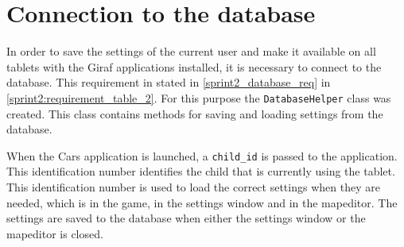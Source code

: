 \section{Connection to the database}
In order to save the settings of the current user and make it available on all tablets with the Giraf applications installed, it is necessary to connect to the database.
This requirement in stated in \cref{sprint2_database_req} in \cref{sprint2:requirement_table_2}.
For this purpose the \lstinline!DatabaseHelper! class was created.
This class contains methods for saving and loading settings from the database. 

When the Cars application is launched, a \lstinline!child_id! is passed to the application. 
This identification number identifies the child that is currently using the tablet.
This identification number is used to load the correct settings when they are needed, which is in the game, in the settings window and in the mapeditor.
The settings are saved to the database when either the settings window or the mapeditor is closed.